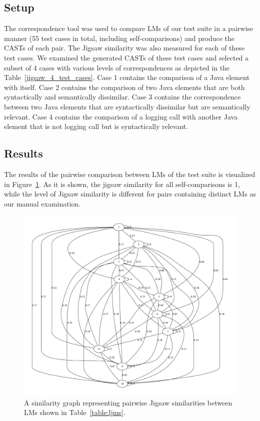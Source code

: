 \subsection{Setup}  \label{study1-setup}
The correspondence tool was used to compare LMs of our test suite in a pairwise manner (55 test cases in total, including self-comparisons) and produce the CASTs of each pair. The Jigsaw similarity was also measured for each of these test cases.
We examined the generated CASTs of these test cases and selected a subset of 4 cases with various levels of correspondences as depicted in the Table~\ref{jigsaw_4_test_cases}. Case 1 contains the comparison of a Java element with itself. Case 2 contains the comparison of two Java elements that are both syntactically and semantically dissimilar.  Case 3 contains the correspondence between two Java elements that are syntactically dissimilar but are semantically relevant. Case 4 contains the comparison of a logging call with another Java element that is not logging call but is syntactically relevant.

\subsection{Results}  \label{study1-results}
The results of the pairwise comparison between LMs of the test suite is visualized in Figure~\ref{fig:jigsaw_graph}. As it is shown, the jigsaw similarity for all self-comparisons is 1, while  the level of Jigsaw similarity is different for pairs containing distinct LMs as our manual examination.

\begin{figure} [H]
  \centering\includegraphics [width = \textwidth]{graphviz/jigsaw.pdf}
  \caption{A similarity graph representing pairwise Jigsaw similarities between LMs shown in Table~\ref{table:ljms}.}
  \label{fig:jigsaw_graph}
\end{figure}


